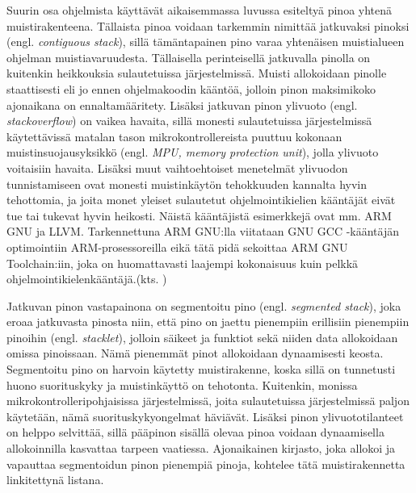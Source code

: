 Suurin osa ohjelmista käyttävät aikaisemmassa luvussa esiteltyä pinoa yhtenä muistirakenteena. Tällaista pinoa voidaan tarkemmin nimittää jatkuvaksi pinoksi (engl. \textit{contiguous stack}), sillä tämäntapainen pino varaa yhtenäisen muistialueen ohjelman muistiavaruudesta. Tällaisella perinteisellä jatkuvalla pinolla on kuitenkin heikkouksia sulautetuissa järjestelmissä. Muisti allokoidaan pinolle staattisesti eli jo ennen ohjelmakoodin kääntöä, jolloin pinon maksimikoko ajonaikana on ennaltamääritety. Lisäksi jatkuvan pinon ylivuoto (engl. \textit{stackoverflow}) on vaikea havaita, sillä monesti sulautetuissa järjestelmissä käytettävissä matalan tason mikrokontrollereista puuttuu kokonaan muistinsuojausyksikkö (engl. \textit{MPU, memory protection unit}), jolla ylivuoto voitaisiin havaita. Lisäksi muut vaihtoehtoiset menetelmät ylivuodon tunnistamiseen ovat monesti muistinkäytön tehokkuuden kannalta hyvin tehottomia, ja joita monet yleiset sulautetut ohjelmointikielien kääntäjät eivät tue tai tukevat hyvin heikosti. Näistä kääntäjistä esimerkkejä ovat mm. ARM GNU ja LLVM.\cite{bsstes@2023} Tarkennettuna ARM GNU:lla viitataan GNU GCC -kääntäjän optimointiin ARM-prosessoreilla eikä tätä pidä sekoittaa ARM GNU Toolchain:iin, joka on huomattavasti laajempi kokonaisuus kuin pelkkä ohjelmointikielenkääntäjä.(kts. \cite{arm})

Jatkuvan pinon vastapainona on segmentoitu pino (engl. \textit{segmented stack}), joka eroaa jatkuvasta pinosta niin, että pino on jaettu pienempiin erillisiin pienempiin pinoihin (engl. \textit{stacklet}), jolloin säikeet ja funktiot sekä niiden data allokoidaan omissa pinoissaan. Nämä pienemmät pinot allokoidaan dynaamisesti keosta. Segmentoitu pino on harvoin käytetty muistirakenne, koska sillä on tunnetusti huono suorituskyky ja muistinkäyttö on tehotonta. Kuitenkin, monissa mikrokontrolleripohjaisissa järjestelmissä, joita sulautetuissa järjestelmissä paljon käytetään, nämä suorituskykyongelmat häviävät. Lisäksi pinon ylivuototilanteet on helppo selvittää, sillä pääpinon sisällä olevaa pinoa voidaan dynaamisella allokoinnilla kasvattaa tarpeen vaatiessa. Ajonaikainen kirjasto, joka allokoi ja vapauttaa segmentoidun pinon pienempiä pinoja, kohtelee tätä muistirakennetta linkitettynä listana.\cite{bsstes@2023}

